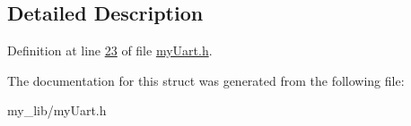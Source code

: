 \subsection{Detailed Description}


Definition at line \hyperlink{my_uart_8h_source_l00023}{23} of file \hyperlink{my_uart_8h_source}{my\-Uart.\-h}.



The documentation for this struct was generated from the following file\-:\begin{DoxyCompactItemize}
\item 
my\-\_\-lib/my\-Uart.\-h\end{DoxyCompactItemize}
